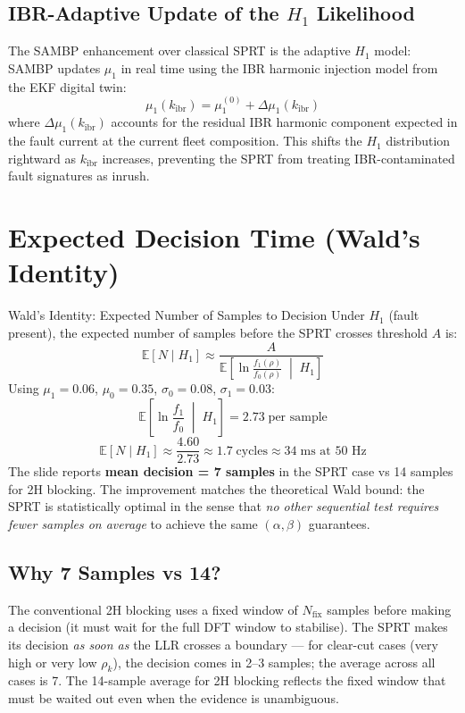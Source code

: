 \documentclass[12pt,a4paper]{article}
\newcommand{\kibr}{k_\mathrm{ibr}}
\begin{document}
\subsection{IBR-Adaptive Update of the $H_1$ Likelihood}

The SAMBP enhancement over classical SPRT is the adaptive $H_1$ model: SAMBP updates $\mu_1$ in real time using the IBR harmonic injection model from the EKF digital twin:
\[
  \mu_1(\kibr) = \mu_1^{(0)} + \Delta\mu_1(\kibr)
\]
where $\Delta\mu_1(\kibr)$ accounts for the residual IBR harmonic component expected in the fault current at the current fleet composition. This shifts the $H_1$ distribution rightward as $\kibr$ increases, preventing the SPRT from treating IBR-contaminated fault signatures as inrush.

\section{Expected Decision Time (Wald's Identity)}

\begin{formulabox}{Wald's Identity: Expected Number of Samples to Decision}
Under $H_1$ (fault present), the expected number of samples before the SPRT crosses threshold $A$ is:
\[
  \mathbb{E}[N \mid H_1] \approx \frac{A}{\mathbb{E}\!\left[\ln\frac{f_1(\rho)}{f_0(\rho)} \;\middle|\; H_1\right]}
\]
Using $\mu_1=0.06$, $\mu_0=0.35$, $\sigma_0=0.08$, $\sigma_1=0.03$:
\[
  \mathbb{E}\!\left[\ln\frac{f_1}{f_0} \;\middle|\; H_1\right] = 2.73\;\text{per sample}
\]
\[
  \mathbb{E}[N \mid H_1] \approx \frac{4.60}{2.73} \approx 1.7\;\text{cycles} \approx 34\;\text{ms at 50~Hz}
\]
The slide reports \textbf{mean decision = 7 samples} in the SPRT case vs 14 samples for 2H blocking. The improvement matches the theoretical Wald bound: the SPRT is statistically optimal in the sense that \textit{no other sequential test requires fewer samples on average} to achieve the same $(\alpha, \beta)$ guarantees.
\end{formulabox}

\subsection{Why 7 Samples vs 14?}

The conventional 2H blocking uses a fixed window of $N_\mathrm{fix}$ samples before making a decision (it must wait for the full DFT window to stabilise). The SPRT makes its decision \textit{as soon as} the LLR crosses a boundary --- for clear-cut cases (very high or very low $\rho_k$), the decision comes in 2--3 samples; the average across all cases is 7. The 14-sample average for 2H blocking reflects the fixed window that must be waited out even when the evidence is unambiguous.
\end{document}
